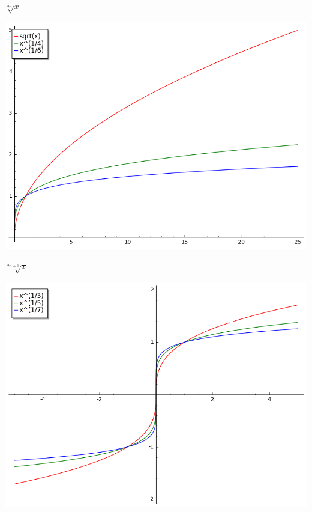 \documentclass{beamer}
\theoremstyle{definition}
\begin{document}
\begin{frame}{$\sqrt[2n]{x}$}
  \begin{center}
    \includegraphics[scale=0.5]{imgs/power3.png}
  \end{center}
\end{frame}

\begin{frame}{$\sqrt[2n + 1]{x}$}
  \begin{center}
    \includegraphics[scale=0.5]{imgs/power4.png}
  \end{center}
\end{frame}
\end{document}
